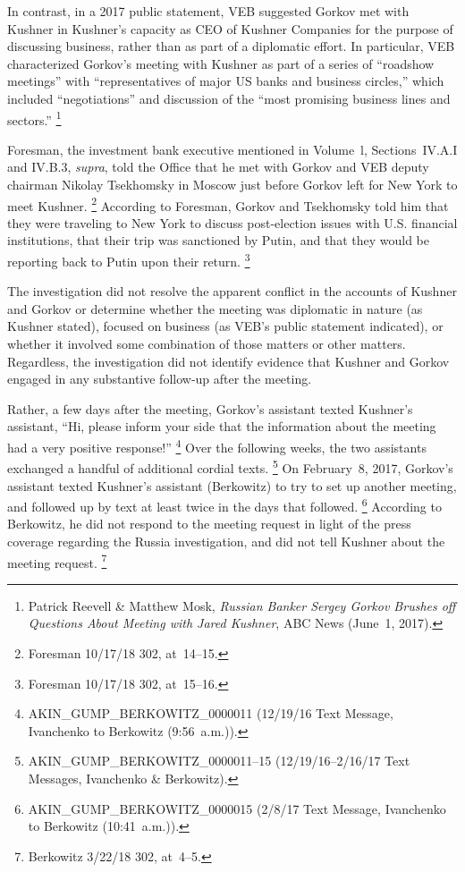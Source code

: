 In contrast, in a 2017 public statement, VEB suggested Gorkov met with Kushner in Kushner's capacity as CEO of Kushner Companies for the purpose of discussing business, rather than as part of a diplomatic effort.
In particular, VEB characterized Gorkov's meeting with Kushner as part of a series of ``roadshow meetings'' with ``representatives of major US banks and business circles,'' which included ``negotiations'' and discussion of the ``most promising business lines and sectors.''%
\footnote{Patrick Reevell \& Matthew Mosk, \textit{Russian Banker Sergey Gorkov Brushes off Questions About Meeting with Jared Kushner}, ABC News (June~1, 2017).}

Foresman, the investment bank executive mentioned in Volume~l, Sections~IV.A.I and IV.B.3, \textit{supra}, told the Office that he met with Gorkov and VEB deputy chairman Nikolay Tsekhomsky in Moscow just before Gorkov left for New York to meet Kushner.%
\footnote{Foresman 10/17/18 302, at~14--15.}
According to Foresman, Gorkov and Tsekhomsky told him that they were traveling to New York to discuss post-election issues with U.S. financial institutions, that their trip was sanctioned by Putin, and that they would be reporting back to Putin upon their return.%
\footnote{Foresman 10/17/18 302, at~15--16.}

The investigation did not resolve the apparent conflict in the accounts of Kushner and Gorkov or determine whether the meeting was diplomatic in nature (as Kushner stated), focused on business (as VEB's public statement indicated), or whether it involved some combination of those matters or other matters.
Regardless, the investigation did not identify evidence that Kushner and Gorkov engaged in any substantive follow-up after the meeting.

Rather, a few days after the meeting, Gorkov's assistant texted Kushner's assistant, ``Hi, please inform your side that the information about the meeting had a very positive response!''%
\footnote{AKIN\_GUMP\_BERKOWITZ\_0000011 (12/19/16 Text Message, Ivanchenko to Berkowitz (9:56~a.m.)).}
Over the following weeks, the two assistants exchanged a handful of additional cordial texts.%
\footnote{AKIN\_GUMP\_BERKOWITZ\_0000011--15 (12/19/16--2/16/17 Text Messages, Ivanchenko \& Berkowitz).}
On February~8, 2017, Gorkov's assistant texted Kushner's assistant (Berkowitz) to try to set up another meeting, and followed up by text at least twice in the days that followed.%
\footnote{AKIN\_GUMP\_BERKOWITZ\_0000015 (2/8/17 Text Message, Ivanchenko to Berkowitz (10:41~a.m.)).}
According to Berkowitz, he did not respond to the meeting request in light of the press coverage regarding the Russia investigation, and did not tell Kushner about the meeting request.%
\footnote{Berkowitz 3/22/18 302, at~4--5.}

